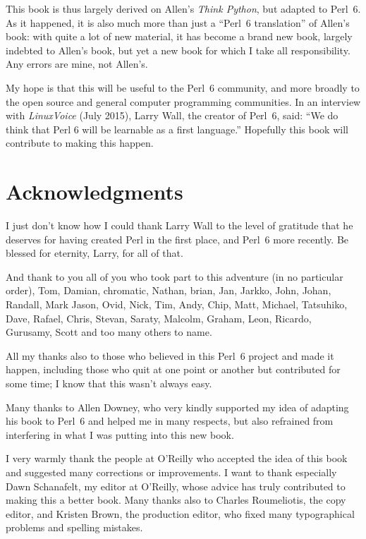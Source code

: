 This book is thus largely derived on Allen's \emph{Think Python}, 
but adapted to Perl~6. As it happened, it is also much more 
than just a ``Perl~6 translation'' of Allen's book: with 
quite a lot of new material, it has become a brand new book, 
largely indebted to Allen's book, but yet a new book for which 
I take all responsibility. Any errors are mine, 
not Allen's.

My hope is that this will be useful to the Perl~6 community, and 
more broadly to the open source and general 
computer programming communities. In an interview with 
\emph{LinuxVoice} (July 2015), Larry Wall, the creator of Perl~6, 
said: ``We do think that Perl 6 will be learnable as a first language.''
Hopefully this book will contribute to making this happen. 

\section*{Acknowledgments}

I just don't know how I could thank Larry Wall to the level of 
gratitude that he deserves for having created Perl in the first 
place, and Perl~6 more recently. Be blessed for eternity, Larry, 
for all of that. 

And thank to you all of you who took part to this 
adventure (in no particular order), Tom, Damian, 
chromatic, Nathan, brian, Jan, Jarkko, John, Johan, Randall, 
Mark Jason, Ovid, Nick, Tim, Andy, Chip, Matt, Michael, Tatsuhiko, 
Dave, Rafael, Chris, Stevan, Saraty, Malcolm, Graham, Leon, 
Ricardo, Gurusamy, Scott and too many others to name.  

All my thanks also to those who believed in 
this Perl~6 project and made it happen, including those who 
quit at one point or another but contributed for some 
time; I know that this wasn't always easy.

Many thanks to Allen Downey, who very kindly supported my idea of 
adapting his book to Perl~6 and helped me in many respects, but 
also refrained from interfering in what I was putting into 
this new book.

I very warmly thank the people at O'Reilly who accepted the 
idea of this book and suggested many corrections or 
improvements. I want to thank especially 
Dawn Schanafelt, my editor at O'Reilly, whose advice 
has truly contributed to making this a better book. Many 
thanks also to Charles Roumeliotis, the copy editor, and 
Kristen Brown, the production editor, who fixed many 
typographical problems and spelling mistakes.

